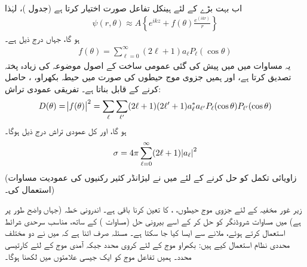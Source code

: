 اب بہت بڑے  کے لئے  ہینکل تفاعل  صورت اختیار کرتا ہے (جدول  )،  لہٰذا
\begin{align}
	\psi(r, \theta)\approx A\left\{e^{ikz}+f(\theta)\frac{e^{(ikr)}}{r}\right\}
\end{align}
ہو گا، جہاں  درج ذیل ہے۔
\begin{align}\label{مساوات_بکھراو_بکھراو_حیطہ}
	f(\theta) = \sum_{\ell=0}^{\infty}(2\ell +1)a_{\ell}P_{\ell}(\cos\theta)
\end{align}
یہ مساوات   میں میں پیش کی گئی عمومی ساخت کے اصول موضوعہ کی زیادہ پختہ  تصدیق کرتا ہے،  اور ہمیں  جزوی موج حیطوں  کی صورت میں حیطہ بکھراو، ،  حاصل  کرنے کے قابل بناتا ہے۔ تفریقی عمودی تراش:
\begin{align}
	D(\theta) = \abs{f(\theta)}^2 = \sum_{\ell}\sum_{\ell'}(2\ell+1)(2\ell'+1)a^*_{\ell}a_{\ell'}P_{\ell}(\cos\theta)P_{\ell'}(\cos\theta)
\end{align}
ہو گا، اور کل عمودی تراش درج ذیل ہوگا۔
\begin{align}\label{مساوات_بکھراو_کل_عمودی_تراش}
	\sigma=4\pi\sum_{\ell=0}^{\infty}(2\ell+1)\abs{a_{\ell}}^2
\end{align}
(زاویائی تکمل کو حل کرنے کے لئے میں نے لیژانڈر کثیر رکنیوں کی عمودیت مساوات   استعمال کی۔)


زیر غور مخفیہ کے لئے جزوی موج حیطوں، ،  کا تعین  کرنا باقی ہے۔ اندرونی خطہ  (جہاں   واضح طور پر     ہے)  میں مساوات شروڈنگر کو حل کر کے اسے بیرونی حل (مساوات ) کے ساتھ،  مناسب سرحدی شرائط استعمال کرتے ہوئے،  ملانے سے ایسا کیا جا سکتا ہے۔ مسئلہ صرف اتنا ہے کہ میں نے دو مختلف محددی نظام  استعمال کیے ہیں: بکھراو موج کے لئے کروی محدد جبکہ آمدی موج کے لئے کارتیسی محدد۔ ہمیں تفاعل موج کو ایک جیسی علامتوں میں لکھنا ہوگا۔

